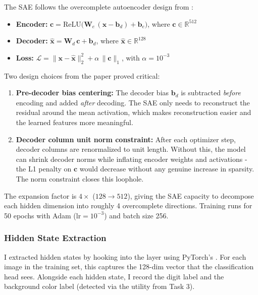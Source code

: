 \documentclass[9pt,a4paper,twocolumn,twoside]{tau-class/tau}
\begin{document}
            The SAE follows the overcomplete autoencoder design from \cite{cunningham2023sparse}:
            \begin{itemize}
                \item \textbf{Encoder:} $\mathbf{c} = \text{ReLU}\bigl(\mathbf{W}_e\,(\mathbf{x} - \mathbf{b}_d) + \mathbf{b}_e\bigr)$, where $\mathbf{c} \in \mathbb{R}^{512}$
                \item \textbf{Decoder:} $\hat{\mathbf{x}} = \mathbf{W}_d\,\mathbf{c} + \mathbf{b}_d$, where $\hat{\mathbf{x}} \in \mathbb{R}^{128}$
                \item \textbf{Loss:} $\mathcal{L} = \|\mathbf{x} - \hat{\mathbf{x}}\|_2^2 + \alpha\,\|\mathbf{c}\|_1$, with $\alpha = 10^{-3}$
            \end{itemize}

            Two design choices from the paper proved critical:

            \begin{enumerate}
                \item \textbf{Pre-decoder bias centering:} The decoder bias $\mathbf{b}_d$ is subtracted \textit{before} encoding and added \textit{after} decoding. The SAE only needs to reconstruct the residual around the mean activation, which makes reconstruction easier and the learned features more meaningful.
                \item \textbf{Decoder column unit norm constraint:} After each optimizer step, decoder columns are renormalized to unit length. Without this, the model can shrink decoder norms while inflating encoder weights and activations - the L1 penalty on $\mathbf{c}$ would decrease without any genuine increase in sparsity. The norm constraint closes this loophole.
            \end{enumerate}

            The expansion factor is $4\times$ ($128 \rightarrow 512$), giving the SAE capacity to decompose each hidden dimension into roughly 4 overcomplete directions. Training runs for 50 epochs with Adam ($\text{lr} = 10^{-3}$) and batch size 256.

        \subsubsection{Hidden State Extraction}

            I extracted hidden states by hooking into the  layer using PyTorch's . For each image in the training set, this captures the 128-dim vector that the classification head sees. Alongside each hidden state, I record the digit label and the background color label (detected via the  utility from Task 3).
\end{document}
